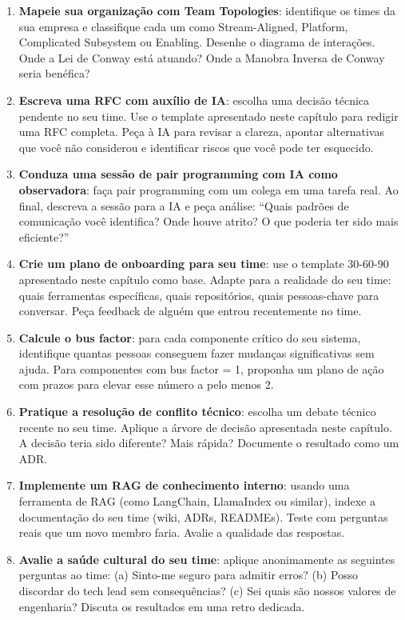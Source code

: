 \begin{enumerate}
    \item \textbf{Mapeie sua organização com Team Topologies}: identifique os
    times da sua empresa e classifique cada um como Stream-Aligned, Platform,
    Complicated Subsystem ou Enabling. Desenhe o diagrama de interações.
    Onde a Lei de Conway está atuando? Onde a Manobra Inversa de Conway
    seria benéfica?

    \item \textbf{Escreva uma RFC com auxílio de IA}: escolha uma decisão
    técnica pendente no seu time. Use o template apresentado neste capítulo
    para redigir uma RFC completa. Peça à IA para revisar a clareza, apontar
    alternativas que você não considerou e identificar riscos que você pode
    ter esquecido.

    \item \textbf{Conduza uma sessão de pair programming com IA como
    observadora}: faça pair programming com um colega em uma tarefa real.
    Ao final, descreva a sessão para a IA e peça análise: ``Quais padrões
    de comunicação você identifica? Onde houve atrito? O que poderia ter
    sido mais eficiente?''

    \item \textbf{Crie um plano de onboarding para seu time}: use o template
    30-60-90 apresentado neste capítulo como base. Adapte para a realidade
    do seu time: quais ferramentas específicas, quais repositórios, quais
    pessoas-chave para conversar. Peça feedback de alguém que entrou
    recentemente no time.

    \item \textbf{Calcule o bus factor}: para cada componente crítico do seu
    sistema, identifique quantas pessoas conseguem fazer mudanças
    significativas sem ajuda. Para componentes com bus factor = 1, proponha
    um plano de ação com prazos para elevar esse número a pelo menos 2.

    \item \textbf{Pratique a resolução de conflito técnico}: escolha um
    debate técnico recente no seu time. Aplique a árvore de decisão
    apresentada neste capítulo. A decisão teria sido diferente? Mais rápida?
    Documente o resultado como um ADR.

    \item \textbf{Implemente um RAG de conhecimento interno}: usando uma
    ferramenta de RAG (como LangChain, LlamaIndex ou similar), indexe a
    documentação do seu time (wiki, ADRs, READMEs). Teste com perguntas
    reais que um novo membro faria. Avalie a qualidade das respostas.

    \item \textbf{Avalie a saúde cultural do seu time}: aplique anonimamente
    as seguintes perguntas ao time: (a) Sinto-me seguro para admitir erros?
    (b) Posso discordar do tech lead sem consequências? (c) Sei quais são
    nossos valores de engenharia? Discuta os resultados em uma retro
    dedicada.
\end{enumerate}
